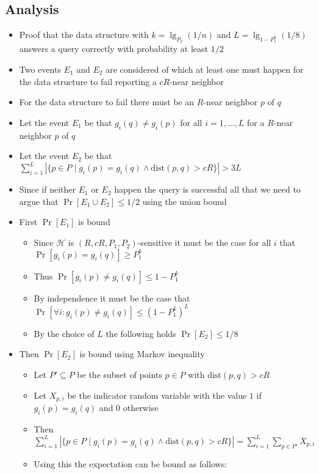 \subsection{Analysis}
\begin{itemize}
	\item Proof that the data structure with $k= \lg_{P_2}(1/n)$ and $L = \lg_{1-P_1^k}(1/8)$ answers a query correctly with probability at least $1/2$
  \item Two events $E_1$ and $E_2$ are considered of which at least one must happen for the data structure to fail reporting a $cR$-near neighbor
  \item For the data structure to fail there must be an $R$-near neighbor $p$ of $q$
  \item Let the event $E_1$ be that $g_i(q) \neq g_i(p)$ for all $i=1, \dots, L$ for a $R$-near neighbor $p$ of $q$
  \item Let the event $E_2$ be that $\sum_{i=1}^L | \{p \in P \mid g_i(p) = g_i(q) \land \text{dist}(p,q) > cR\} | > 3L$
  \item Since if neither $E_1$ or $E_2$ happen the query is successful all that we need to argue that $\Pr[E_1 \cup E_2] \leq 1/2$ using the union bound
  \item First $\Pr[E_1]$ is bound
  \begin{itemize}
  	\item Since $\mathcal H$ is $(R,cR, P_1, P_2)$-sensitive it must be the case for all $i$ that $\Pr[g_i(p)=g_i(q)] \geq P_1^k$
    \item Thus $\Pr[g_i(p) \neq g_i(q)] \leq 1-P_1^k$
    \item By independence it must be the case that $\Pr[\forall i: g_i(p) \neq g_i(q)] \leq (1-P_1^k)^L$
    \item By the choice of $L$ the following holds $\Pr[E_2] \leq 1/8$
  \end{itemize}
  \item Then $\Pr[E_2]$ is bound using Markov inequality
  \begin{itemize}
  	\item Let $P' \subseteq P$ be the subset of points $p \in P$ with $\text{dist}(p,q) > cR$
    \item Let $X_{p,i}$ be the indicator random variable with the value $1$ if $g_i(p) = g_i(q)$ and $0$ otherwise
    \item Then $\sum_{i=1}^L | \{p \in P \mid g_i(p) = g_i(q) \land \text{dist}(p,q) > cR\} | = \sum_{i=1}^L \sum_{p \in P'}X_{p,i}$
    \item Using this the expectation can be bound as follows:

\end{itemize}
\end{itemize}
